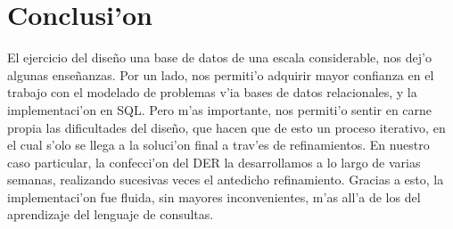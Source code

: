\section{Conclusi'on}

El ejercicio del dise\~{n}o una base de datos de una escala considerable, nos dej'o algunas ense\~{n}anzas. Por un lado, nos permiti'o adquirir mayor confianza en el trabajo con el modelado de problemas v'ia bases de datos relacionales, y la implementaci'on en SQL. Pero m'as importante, nos permiti'o sentir en carne propia las dificultades del dise\~{n}o, que hacen que de esto un proceso iterativo, en el cual s'olo se llega a la soluci'on final a trav'es de refinamientos. En nuestro caso particular, la confecci'on del DER la desarrollamos a lo largo de varias semanas, realizando sucesivas veces el antedicho refinamiento. Gracias a esto, la implementaci'on fue fluida, sin mayores inconvenientes, m'as all'a de los del aprendizaje del lenguaje de consultas.